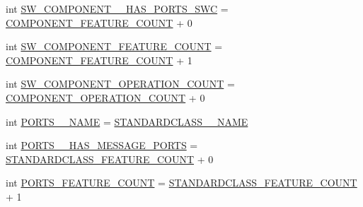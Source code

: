 \begin{DoxyCompactItemize}
\item 
int \hyperlink{interfaceshootingmachineemfmodel_1_1_shootingmachineemfmodel_package_a7d0daf7c3d11e945ee6db374a27ba337}{S\-W\-\_\-\-C\-O\-M\-P\-O\-N\-E\-N\-T\-\_\-\-\_\-\-H\-A\-S\-\_\-\-P\-O\-R\-T\-S\-\_\-\-S\-W\-C} = \hyperlink{interfaceshootingmachineemfmodel_1_1_shootingmachineemfmodel_package_af14170e6e67cfb56248e8390eaedc6fc}{C\-O\-M\-P\-O\-N\-E\-N\-T\-\_\-\-F\-E\-A\-T\-U\-R\-E\-\_\-\-C\-O\-U\-N\-T} + 0
\item 
int \hyperlink{interfaceshootingmachineemfmodel_1_1_shootingmachineemfmodel_package_a162e5db29d58ad16579291bbdc215707}{S\-W\-\_\-\-C\-O\-M\-P\-O\-N\-E\-N\-T\-\_\-\-F\-E\-A\-T\-U\-R\-E\-\_\-\-C\-O\-U\-N\-T} = \hyperlink{interfaceshootingmachineemfmodel_1_1_shootingmachineemfmodel_package_af14170e6e67cfb56248e8390eaedc6fc}{C\-O\-M\-P\-O\-N\-E\-N\-T\-\_\-\-F\-E\-A\-T\-U\-R\-E\-\_\-\-C\-O\-U\-N\-T} + 1
\item 
int \hyperlink{interfaceshootingmachineemfmodel_1_1_shootingmachineemfmodel_package_a9aa427e39341f11b62684dd213391b4b}{S\-W\-\_\-\-C\-O\-M\-P\-O\-N\-E\-N\-T\-\_\-\-O\-P\-E\-R\-A\-T\-I\-O\-N\-\_\-\-C\-O\-U\-N\-T} = \hyperlink{interfaceshootingmachineemfmodel_1_1_shootingmachineemfmodel_package_acec1e36886a6e79a88055810db488d36}{C\-O\-M\-P\-O\-N\-E\-N\-T\-\_\-\-O\-P\-E\-R\-A\-T\-I\-O\-N\-\_\-\-C\-O\-U\-N\-T} + 0
\item 
int \hyperlink{interfaceshootingmachineemfmodel_1_1_shootingmachineemfmodel_package_a19c316778a7ed9961757b257c512945a}{P\-O\-R\-T\-S\-\_\-\-\_\-\-N\-A\-M\-E} = \hyperlink{interfaceshootingmachineemfmodel_1_1_shootingmachineemfmodel_package_a06475d7d54d52ee19b2aaf4d5d73c738}{S\-T\-A\-N\-D\-A\-R\-D\-C\-L\-A\-S\-S\-\_\-\-\_\-\-N\-A\-M\-E}
\item 
int \hyperlink{interfaceshootingmachineemfmodel_1_1_shootingmachineemfmodel_package_abfa26d954e44f83dadd22a364a5ede44}{P\-O\-R\-T\-S\-\_\-\-\_\-\-H\-A\-S\-\_\-\-M\-E\-S\-S\-A\-G\-E\-\_\-\-P\-O\-R\-T\-S} = \hyperlink{interfaceshootingmachineemfmodel_1_1_shootingmachineemfmodel_package_a14037f66989b3107e402142df96ee9aa}{S\-T\-A\-N\-D\-A\-R\-D\-C\-L\-A\-S\-S\-\_\-\-F\-E\-A\-T\-U\-R\-E\-\_\-\-C\-O\-U\-N\-T} + 0
\item 
int \hyperlink{interfaceshootingmachineemfmodel_1_1_shootingmachineemfmodel_package_a1ea63d8ed0fd32dbb04f8c83812629eb}{P\-O\-R\-T\-S\-\_\-\-F\-E\-A\-T\-U\-R\-E\-\_\-\-C\-O\-U\-N\-T} = \hyperlink{interfaceshootingmachineemfmodel_1_1_shootingmachineemfmodel_package_a14037f66989b3107e402142df96ee9aa}{S\-T\-A\-N\-D\-A\-R\-D\-C\-L\-A\-S\-S\-\_\-\-F\-E\-A\-T\-U\-R\-E\-\_\-\-C\-O\-U\-N\-T} + 1

\end{DoxyCompactItemize}
